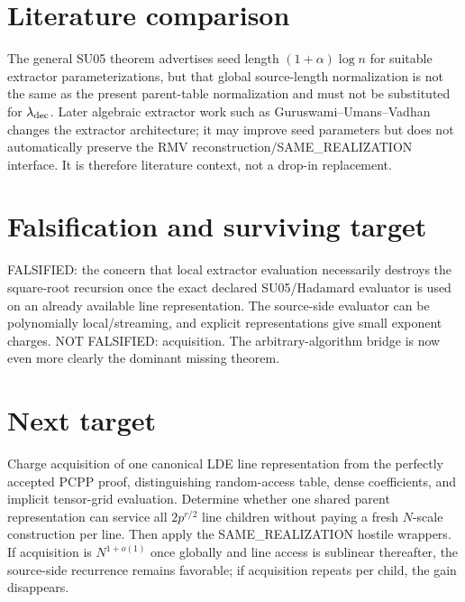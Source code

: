 \documentclass[11pt]{article}
\begin{document}
\section*{Literature comparison}
The general SU05 theorem advertises seed length $(1+\alpha)\log n$ for suitable extractor parameterizations, but that global source-length normalization is not the same as the present parent-table normalization and must not be substituted for $\lambda_{\rm dec}$. Later algebraic extractor work such as Guruswami--Umans--Vadhan changes the extractor architecture; it may improve seed parameters but does not automatically preserve the RMV reconstruction/SAME\_REALIZATION interface. It is therefore literature context, not a drop-in replacement.
\section*{Falsification and surviving target}
FALSIFIED: the concern that local extractor evaluation necessarily destroys the square-root recursion once the exact declared SU05/Hadamard evaluator is used on an already available line representation. The source-side evaluator can be polynomially local/streaming, and explicit representations give small exponent charges.
NOT FALSIFIED: acquisition. The arbitrary-algorithm bridge is now even more clearly the dominant missing theorem.
\section*{Next target}
Charge acquisition of one canonical LDE line representation from the perfectly accepted PCPP proof, distinguishing random-access table, dense coefficients, and implicit tensor-grid evaluation. Determine whether one shared parent representation can service all $2p^{r/2}$ line children without paying a fresh $N$-scale construction per line. Then apply the SAME\_REALIZATION hostile wrappers. If acquisition is $N^{1+o(1)}$ once globally and line access is sublinear thereafter, the source-side recurrence remains favorable; if acquisition repeats per child, the gain disappears.
\end{document}
